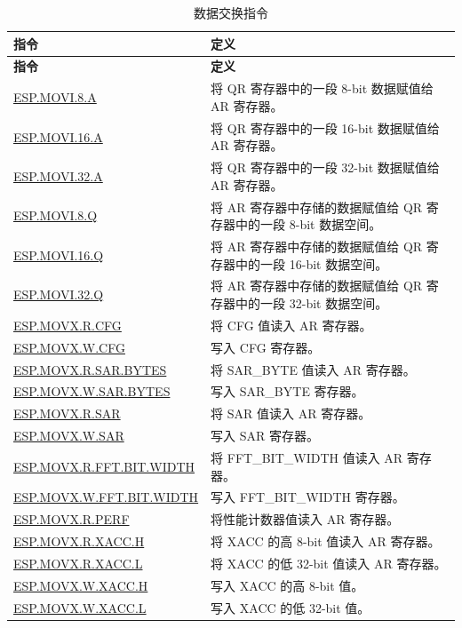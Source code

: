 \begin{longtable}[c]{|l|m{11cm}|}
    \caption{数据交换指令}
    \label{tab:pie-data-exchange-instructions}\\
    \hline
    \rowcolor{lightgray}
        \textbf{指令} & \textbf{定义} \\\hline
    \endfirsthead
    \rowcolor{lightgray}
    \textbf{指令} & \textbf{定义} \\\hline
    \endhead
    \endfoot

    \hyperref[instruction:ESPMOVI8A]{ESP.MOVI.8.A} & 将 QR 寄存器中的一段 8-bit 数据赋值给 AR 寄存器。\\\hline
    \hyperref[instruction:ESPMOVI16A]{ESP.MOVI.16.A} & 将 QR 寄存器中的一段 16-bit 数据赋值给 AR 寄存器。\\\hline
    \hyperref[instruction:ESPMOVI32A]{ESP.MOVI.32.A} & 将 QR 寄存器中的一段 32-bit 数据赋值给 AR 寄存器。\\\hline
    \hyperref[instruction:ESPMOVI8Q]{ESP.MOVI.8.Q} & 将 AR 寄存器中存储的数据赋值给 QR 寄存器中的一段 8-bit 数据空间。\\\hline
    \hyperref[instruction:ESPMOVI16Q]{ESP.MOVI.16.Q} & 将 AR 寄存器中存储的数据赋值给 QR 寄存器中的一段 16-bit 数据空间。\\\hline
    \hyperref[instruction:ESPMOVI32Q]{ESP.MOVI.32.Q} & 将 AR 寄存器中存储的数据赋值给 QR 寄存器中的一段 32-bit 数据空间。\\\hline

    \hyperref[instruction:ESPMOVXRCFG]{ESP.MOVX.R.CFG} & 将 CFG 值读入 AR 寄存器。\\\hline
    \hyperref[instruction:ESPMOVXWCFG]{ESP.MOVX.W.CFG} & 写入 CFG 寄存器。\\\hline
    \hyperref[instruction:ESPMOVXRSAR_BYTES]{ESP.MOVX.R.SAR.BYTES} & 将 SAR\_BYTE 值读入 AR 寄存器。\\\hline
    \hyperref[instruction:ESPMOVXWSAR_BYTES]{ESP.MOVX.W.SAR.BYTES} & 写入 SAR\_BYTE 寄存器。\\\hline
    \hyperref[instruction:ESPMOVXRSAR]{ESP.MOVX.R.SAR} & 将 SAR 值读入 AR 寄存器。\\\hline
    \hyperref[instruction:ESPMOVXWSAR]{ESP.MOVX.W.SAR} & 写入 SAR 寄存器。\\\hline
    \hyperref[instruction:ESPMOVXRFFT_BIT_WIDTH]{ESP.MOVX.R.FFT.BIT.WIDTH} & 将 FFT\_BIT\_WIDTH 值读入 AR 寄存器。\\\hline
    \hyperref[instruction:ESPMOVXWFFT_BIT_WIDTH]{ESP.MOVX.W.FFT.BIT.WIDTH} & 写入 FFT\_BIT\_WIDTH 寄存器。\\\hline
    \hyperref[instruction:ESPMOVXRPERF]{ESP.MOVX.R.PERF} & 将性能计数器值读入 AR 寄存器。\\\hline
    \hyperref[instruction:ESPMOVXRXACCH]{ESP.MOVX.R.XACC.H} & 将 XACC 的高 8-bit 值读入 AR 寄存器。\\\hline
    \hyperref[instruction:ESPMOVXRXACCL]{ESP.MOVX.R.XACC.L} & 将 XACC 的低 32-bit 值读入 AR 寄存器。\\\hline
    \hyperref[instruction:ESPMOVXWXACCH]{ESP.MOVX.W.XACC.H} & 写入 XACC 的高 8-bit 值。\\\hline
    \hyperref[instruction:ESPMOVXWXACCL]{ESP.MOVX.W.XACC.L} & 写入 XACC 的低 32-bit 值。\\\hline


\end{longtable}
